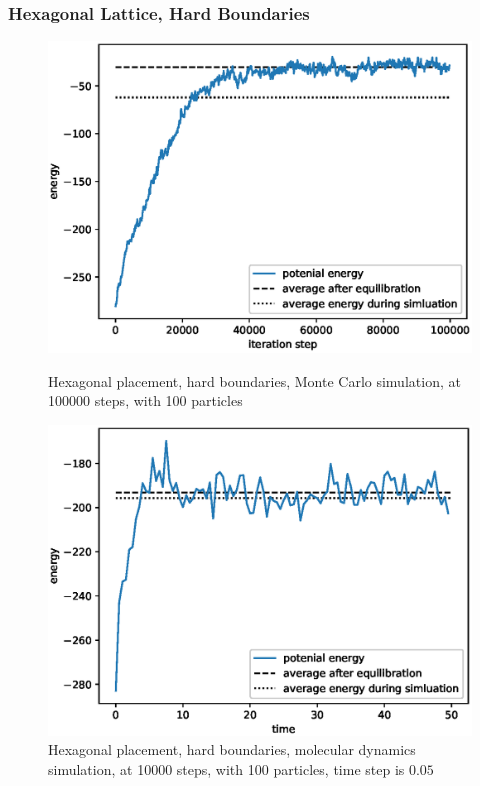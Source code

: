 \documentclass[UTF8,a4paper]{article}
\begin{document}
\subsubsection{Hexagonal Lattice, Hard Boundaries}
\begin{figure}[H]
	\centering
	\begin{minipage}[t]{0.45\textwidth}
		\centering
		\includegraphics[height=0.2\textheight]{fig/exp2_hex_hard_mc.eps}
		\caption{Hexagonal placement, hard boundaries, Monte Carlo simulation, at 100000 steps, with 100 particles}
	\end{minipage}\hspace{0.5cm}
	\begin{minipage}[t]{0.45\textwidth}
		\centering
		\includegraphics[height=0.2\textheight]{fig/md_plot_norand_hard_10000_steps_100_particles_0.8442_rho_0.728_tempure_.eps}
		\caption{Hexagonal placement, hard boundaries, molecular dynamics simulation, at 10000 steps, with 100 particles, time step is $0.05$}
	\end{minipage}
\end{figure}
\end{document}
